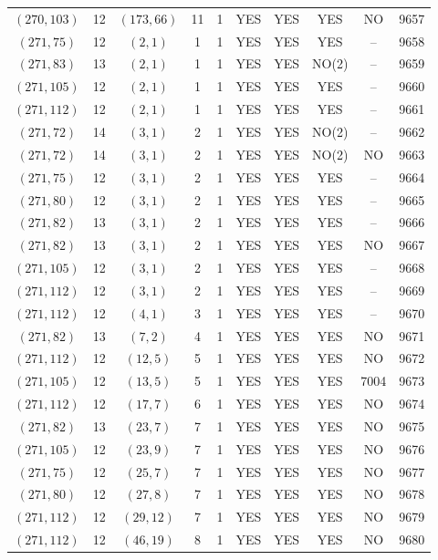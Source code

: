 \begin{longtable}{|c|c|c|c|c|c|c|c|c|c|}
$(270, 103)$ & 12 & $(173, 66)$ & 11 & 1 & YES & YES & YES & NO & 9657\\
$(271, 75)$ & 12 & $(2, 1)$ & 1 & 1 & YES & YES & YES & -- & 9658\\
$(271, 83)$ & 13 & $(2, 1)$ & 1 & 1 & YES & YES & NO(2) & -- & 9659\\
$(271, 105)$ & 12 & $(2, 1)$ & 1 & 1 & YES & YES & YES & -- & 9660\\
$(271, 112)$ & 12 & $(2, 1)$ & 1 & 1 & YES & YES & YES & -- & 9661\\
$(271, 72)$ & 14 & $(3, 1)$ & 2 & 1 & YES & YES & NO(2) & -- & 9662\\
$(271, 72)$ & 14 & $(3, 1)$ & 2 & 1 & YES & YES & NO(2) & NO & 9663\\
$(271, 75)$ & 12 & $(3, 1)$ & 2 & 1 & YES & YES & YES & -- & 9664\\
$(271, 80)$ & 12 & $(3, 1)$ & 2 & 1 & YES & YES & YES & -- & 9665\\
$(271, 82)$ & 13 & $(3, 1)$ & 2 & 1 & YES & YES & YES & -- & 9666\\
$(271, 82)$ & 13 & $(3, 1)$ & 2 & 1 & YES & YES & YES & NO & 9667\\
$(271, 105)$ & 12 & $(3, 1)$ & 2 & 1 & YES & YES & YES & -- & 9668\\
$(271, 112)$ & 12 & $(3, 1)$ & 2 & 1 & YES & YES & YES & -- & 9669\\
$(271, 112)$ & 12 & $(4, 1)$ & 3 & 1 & YES & YES & YES & -- & 9670\\
$(271, 82)$ & 13 & $(7, 2)$ & 4 & 1 & YES & YES & YES & NO & 9671\\
$(271, 112)$ & 12 & $(12, 5)$ & 5 & 1 & YES & YES & YES & NO & 9672\\
$(271, 105)$ & 12 & $(13, 5)$ & 5 & 1 & YES & YES & YES & 7004 & 9673\\
$(271, 112)$ & 12 & $(17, 7)$ & 6 & 1 & YES & YES & YES & NO & 9674\\
$(271, 82)$ & 13 & $(23, 7)$ & 7 & 1 & YES & YES & YES & NO & 9675\\
$(271, 105)$ & 12 & $(23, 9)$ & 7 & 1 & YES & YES & YES & NO & 9676\\
$(271, 75)$ & 12 & $(25, 7)$ & 7 & 1 & YES & YES & YES & NO & 9677\\
$(271, 80)$ & 12 & $(27, 8)$ & 7 & 1 & YES & YES & YES & NO & 9678\\
$(271, 112)$ & 12 & $(29, 12)$ & 7 & 1 & YES & YES & YES & NO & 9679\\
$(271, 112)$ & 12 & $(46, 19)$ & 8 & 1 & YES & YES & YES & NO & 9680\\

\end{longtable}
